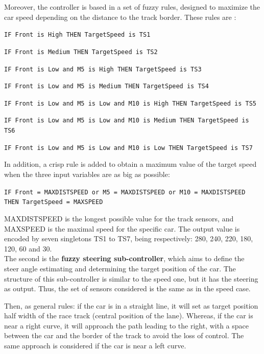 \documentclass[10pt,journal,compsoc]{IEEEtran}
\begin{document}
Moreover, the controller is based in a set of fuzzy rules, designed to
maximize the car speed depending on the distance to the track
border. These rules are \cite{salem_evo17}:
 \begin{itemize}
 {\small
 	\item \texttt{IF Front is High THEN TargetSpeed is TS1}
 	\item \texttt{IF Front is Medium THEN TargetSpeed is TS2}
 	\item \texttt{IF Front is Low and M5 is High THEN TargetSpeed is TS3}
 	\item \texttt{IF Front is Low and M5 is Medium THEN TargetSpeed is TS4}
 	\item \texttt{IF Front is Low and M5 is Low and M10 is High THEN TargetSpeed is TS5}
 	\item \texttt{IF Front is Low and M5 is Low and M10 is Medium THEN TargetSpeed is TS6}
 	\item \texttt{IF Front is Low and M5 is Low and M10 is Low THEN TargetSpeed is TS7}\\
 }
%
In addition, a crisp rule is added to obtain a maximum value of the target speed when the three input variables are as big as possible:\\
 {\small	
 \item \texttt{IF Front = MAXDISTSPEED or M5 = MAXDISTSPEED or M10 = MAXDISTSPEED THEN TargetSpeed = MAXSPEED}
 }
 \end{itemize}

 MAXDISTSPEED is the longest possible value for the track sensors, and MAXSPEED is the maximal speed for the specific car. 
 The output value is encoded by seven singletons TS1 to TS7, being respectively: 280, 240, 220, 180, 120, 60 and 30.\\
%
%
%

The second is the \textbf{fuzzy steering sub-controller}, which aims to define the steer angle estimating and determining the target position of the car. 
%
The structure of this sub-controller is similar to the speed one, but it has the steering as output. Thus, the set of sensors considered is the same as in the speed case.

Then, as general rules: if the car is in a straight line, it will set as target position half width of the race track (central position of the lane). Whereas, if the car is near a right curve, it will approach the path leading to the right, with a space between the car and the border of the track to avoid the loss of control. The same approach is considered if the car is near a left curve.
\end{document}
